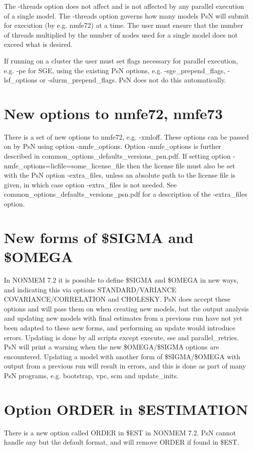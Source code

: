 The -threads option does not affect and is not affected by any parallel execution of a single model. The -threads option governs how many models PsN will submit for execution (by e.g. nmfe72) at a time. The user must ensure that the number of threads multiplied by the number of nodes used for a single model does not exceed what is desired. 

If running on a cluster the user must set flags necessary for parallel execution, e.g. -pe for SGE, using the existing PsN options, e.g. -sge\_prepend\_flags, -lsf\_options or -slurm\_prepend\_flags. PsN does not do this automatically. 
\section{New options to nmfe72, nmfe73}
There is a set of new options to nmfe72, e.g. -xmloff. These options can be passed on by PsN using option -nmfe\_options. Option -nmfe\_options is further described in common\_options\_defaults\_versions\_psn.pdf. If setting option -nmfe\_options=licfile=some\_license\_file then the license file must also be set with the PsN option -extra\_files, unless an absolute path to the license file is given, in which case option -extra\_files is not needed. See common\_options\_defaults\_versions\_psn.pdf for a description of the -extra\_files option.

\section{New forms of \$SIGMA and \$OMEGA}
In NONMEM 7.2 it is possible to define \$SIGMA and \$OMEGA in new ways, and indicating this via options STANDARD/VARIANCE COVARIANCE/CORRELATION and CHOLESKY. PsN does accept these options and will pass them on when creating new models, but the output analysis and updating new models with final estimates from a previous run have not yet been adapted to these new forms, and performing an update would introduce errors. Updating is done by all scripts except execute, sse and parallel\_retries. PsN will print a warning when the new \$OMEGA/\$SIGMA options are encountered. Updating a model with another form of \$SIGMA/\$OMEGA with output from a previous run will result in errors, and this is done as part of many PsN programs, e.g. bootstrap, vpc, scm and update\_inits. 

\section{Option ORDER in \$ESTIMATION}
There is a new option called ORDER in \$EST in NONMEM 7.2. PsN cannot handle any but the default format, and will remove ORDER if found in \$EST.

